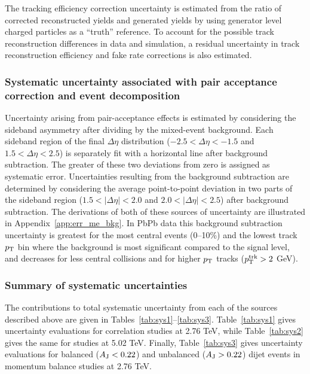 The tracking efficiency correction uncertainty is estimated from the ratio of corrected reconstructed yields and generated yields by using generator level charged particles as a ``truth'' reference.  To account for the possible track reconstruction differences in data and simulation, a residual uncertainty in track reconstruction efficiency and fake rate corrections is also estimated.   

\subsubsection{Systematic uncertainty associated with pair acceptance correction and event decomposition}

Uncertainty arising from pair-acceptance effects is estimated by considering the sideband asymmetry after dividing by the mixed-event background.  Each sideband region of the final $\Delta\eta$ distribution ($-2.5<\Delta\eta<-1.5$ and $1.5<\Delta\eta<2.5$) is separately fit with a horizontal line after background subtraction.  The greater of these two deviations from zero is assigned as systematic error.  Uncertainties resulting from the background subtraction are determined by considering the average point-to-point deviation in two parts of the sideband region ($1.5<|\Delta\eta|<2.0$ and $2.0<|\Delta\eta|<2.5$) after background subtraction.  The derivations of both of these sources of uncertainty are illustrated in Appendix~\ref{app:err_me_bkg}.  In PbPb data this background subtraction uncertainty is greatest for the most central events (0--10\%) and the lowest track $p_{\rm T}$ bin where the background is most significant compared to the signal level, and decreases for less central collisions and for higher $p_{\rm T}$ tracks ($p_{\rm T}^{\rm trk} > 2$ GeV).  

\subsubsection{Summary of systematic uncertainties}

The contributions to total systematic uncertainty from each of the sources described above are given in Tables~\ref{tab:sys1}--\ref{tab:sys3}. Table~\ref{tab:sys1} gives uncertainty evaluations for correlation studies at 2.76 TeV, while Table~\ref{tab:sys2} gives the same for studies at 5.02 TeV.  Finally, Table~\ref{tab:sys3} gives uncertainty evaluations for balanced ($A_{\rm J} < 0.22$) and unbalanced ($A_{\rm J} > 0.22$) dijet events in momentum balance studies at 2.76 TeV.  


